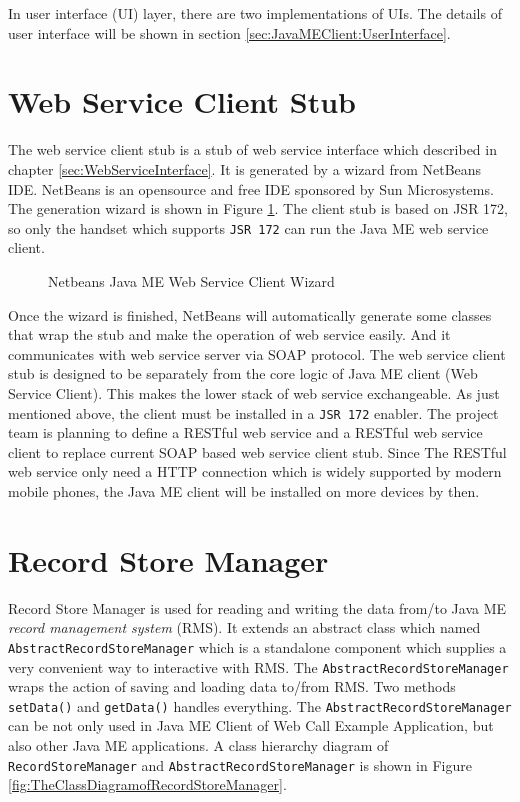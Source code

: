 In user interface (UI) layer, there are two implementations of UIs. The details of user interface will be shown in section \ref{sec:JavaMEClient:UserInterface}. 

\section{Web Service Client Stub}
\label{sec:JavaMEClient:WebServiceClientStub}

The web service client stub is a stub of web service interface which described in chapter \nolinebreak \ref{sec:WebServiceInterface}. It is generated by a wizard from NetBeans IDE. NetBeans is an opensource and free IDE sponsored by Sun Microsystems. The generation wizard is shown in Figure \ref{fig:NetbeansJavaMEWebServiceClientWizard}. The client stub is based on JSR 172, so only the handset which supports \texttt{JSR 172} can run the Java ME web service client.

\begin{figure}[!hbtp]
\centering
{}
\caption{Netbeans Java ME Web Service Client Wizard}
\label{fig:NetbeansJavaMEWebServiceClientWizard}
\end{figure}

Once the wizard is finished, NetBeans will automatically generate some classes that wrap the stub and make the operation of web service easily. And it communicates with web service server via SOAP protocol. The web service client stub is designed to be separately from the core logic of Java ME client (Web Service Client). This makes the lower stack of web service exchangeable. As just mentioned above, the client must be installed in a \texttt{JSR 172} enabler. The project team is planning to define a RESTful web service and a RESTful web service client to replace current SOAP based web service client stub. Since The RESTful web service only need a HTTP connection which is widely supported by modern mobile phones, the Java ME client will be installed on more devices by then. 


\section{Record Store Manager}
\label{sec:JavaMEClient:RecordStoreManager}

Record Store Manager is used for reading and writing the data from/to Java ME \textit{record management system} (RMS). It extends an abstract class which named \texttt{AbstractRecordStoreManager} which is a standalone component which supplies a very convenient way to interactive with RMS. The \texttt{AbstractRecordStoreManager} wraps the action of saving and loading data to/from RMS. Two methods \texttt{setData()} and \texttt{getData()} handles everything. The \texttt{AbstractRecordStoreManager} can be not only used in Java ME Client of Web Call Example Application, but also other Java ME applications. A class hierarchy diagram of \texttt{RecordStoreManager} and \texttt{AbstractRecordStoreManager} is shown in Figure \ref{fig:TheClassDiagramofRecordStoreManager}.

